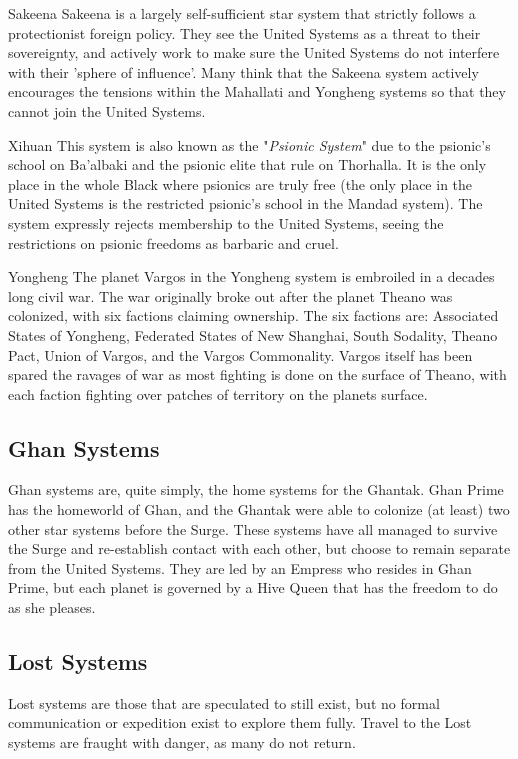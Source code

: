 \begin{multicols}{2}
  \begin{genericsection}{Sakeena}
  Sakeena is a largely self-sufficient star system that strictly follows a protectionist foreign policy. They see the United Systems as a threat to their sovereignty, and actively work to make sure the United Systems do not interfere with their 'sphere of influence'. Many think that the Sakeena system actively encourages the tensions within the Mahallati and Yongheng systems so that they cannot join the United Systems.
  \end{genericsection}
  
  \begin{genericsection}{Xihuan}
  This system is also known as the "\textit{Psionic System}" due to the psionic's school on Ba’albaki and the psionic elite that rule on Thorhalla. It is the only place in the whole Black where psionics are truly free (the only place in the United Systems is the restricted psionic's school in the Mandad system). The system expressly rejects membership to the United Systems, seeing the restrictions on psionic freedoms as barbaric and cruel.
  \end{genericsection}
  
  \begin{genericsection}{Yongheng}
  The planet Vargos in the Yongheng system is embroiled in a decades long civil war. The war originally broke out after the planet Theano was colonized, with six factions claiming ownership. The six factions are: Associated States of Yongheng, Federated States of New Shanghai, South Sodality, Theano Pact, Union of Vargos, and the Vargos Commonality. Vargos itself has been spared the ravages of war as most fighting is done on the surface of Theano, with each faction fighting over patches of territory on the planets surface.
  \end{genericsection}

  \subsection{Ghan Systems}
  
  Ghan systems are, quite simply, the home systems for the Ghantak. Ghan Prime has the homeworld of Ghan, and the Ghantak were able to colonize (at least) two other star systems before the Surge. These systems have all managed to survive the Surge and re-establish contact with each other, but choose to remain separate from the United Systems. They are led by an Empress who resides in Ghan Prime, but each planet is governed by a Hive Queen that has the freedom to do as she pleases.

  \subsection{Lost Systems}
  
  Lost systems are those that are speculated to still exist, but no formal communication or expedition exist to explore them fully. Travel to the Lost systems are fraught with danger, as many do not return.
  
  
\end{multicols}

\newpage




